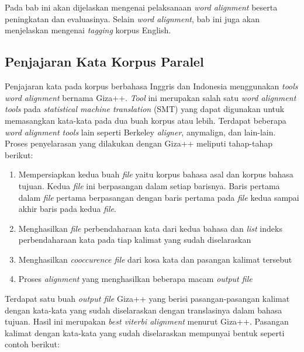 \chapter{\babTiga}
Pada bab ini akan dijelaskan mengenai pelaksanaan \textit{word alignment} beserta peningkatan dan evaluasinya. Selain \textit{word alignment}, bab ini juga akan menjelaskan mengenai \textit{tagging} korpus English.

\section{Penjajaran Kata Korpus Paralel}
Penjajaran kata pada korpus berbahasa Inggris dan Indonesia menggunakan \textit{tools word alignment} bernama Giza++. \textit{Tool} ini merupakan salah satu \textit{word alignment tools} pada \textit{statistical machine translation} (SMT) yang dapat digunakan untuk memasangkan kata-kata pada dua buah korpus atau lebih. Terdapat beberapa \textit{word alignment tools} lain seperti Berkeley \textit{aligner}, anymalign, dan lain-lain. Proses penyelarasan yang dilakukan dengan Giza++ meliputi tahap-tahap berikut:
\begin{enumerate}
	\item Mempersiapkan kedua buah \textit{file} yaitu korpus bahasa asal dan korpus bahasa tujuan. Kedua \textit{file} ini berpasangan dalam setiap barisnya. Baris pertama dalam \textit{file} pertama berpasangan dengan baris pertama pada \textit{file} kedua sampai akhir baris pada kedua \textit{file}.
	\item Menghasilkan \textit{file} perbendaharaan kata dari kedua bahasa dan \textit{list} indeks perbendaharaan kata pada tiap kalimat yang sudah diselaraskan
	\item Menghasilkan \textit{cooccurence file} dari kosa kata dan pasangan kalimat tersebut
	\item Proses \textit{alignment} yang menghasilkan beberapa macam \textit{output file} 
\end{enumerate}

Terdapat satu buah \textit{output file} Giza++ yang berisi pasangan-pasangan kalimat dengan kata-kata yang sudah diselaraskan dengan translasinya dalam bahasa tujuan. Hasil ini merupakan \textit{best viterbi alignment} menurut Giza++. Pasangan kalimat dengan kata-kata yang sudah diselaraskan mempunyai bentuk seperti contoh berikut:

